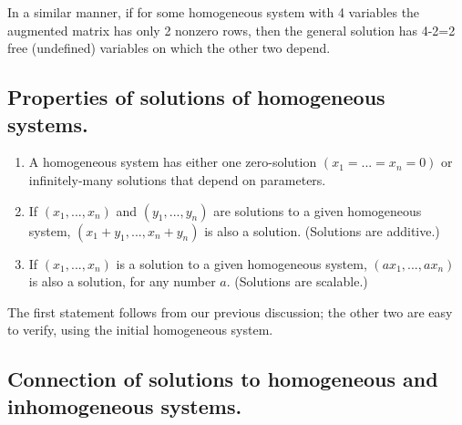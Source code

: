 In a similar manner, if for some homogeneous system with 4 variables the augmented matrix has only 2 nonzero rows, then the
general solution has 4-2=2 free (undefined) variables on which the other two depend.

\subsection{Properties of solutions of homogeneous systems.}

\begin{enumerate}
\item A homogeneous system has either one zero-solution $(x_1=...=x_n=0)$ or infinitely-many solutions that depend on
parameters.
\item If $(x_1,...,x_n)$ and $(y_1,...,y_n)$ are solutions to a given homogeneous system, $(x_1+y_1,...,x_n+y_n)$ is
also a solution. (Solutions are additive.)
\item If $(x_1,...,x_n)$ is a solution to a given homogeneous system, $(ax_1,...,ax_n)$ is also a solution, for any
number $a$. (Solutions are scalable.)
\end{enumerate}

The first statement follows from our previous discussion; the other two are easy to verify, using the initial homogeneous
system.

\subsection{Connection of solutions to homogeneous and inhomogeneous systems.}

